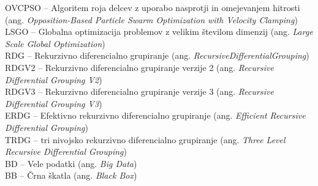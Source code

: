 OVCPSO -- Algoritem roja delcev z uporabo nasprotji in omejevanjem hitrosti (ang. \textit{Opposition-Based Particle Swarm Optimization with Velocity Clamping}) \\
LSGO -- Globalna optimizacija problemov z velikim številom dimenzij (ang. \textit{Large Scale Global Optimization}) \\
RDG -- Rekurzivno diferencialno grupiranje (ang. \textit{RecursiveDifferentialGrouping}) \\
RDGV2 -- Rekurzivno diferencialno grupiranje verzije 2 (ang. \textit{Recursive Differential Grouping V2}) \\
RDGV3 -- Rekurzivno diferencialno grupiranje verzije 3 (ang. \textit{Recursive Differential Grouping V3}) \\
ERDG -- Efektivno rekurzivno diferencialno grupiranje (ang. \textit{Efficient Recursive Differential Grouping}) \\
TRDG -- tri nivojsko rekurzivno diferencialno grupiranje (ang. \textit{Three Level Recursive Differential Grouping}) \\
BD -- Vele podatki (ang. \textit{Big Data}) \\
BB -- Črna škatla (ang. \textit{Black Box}) \\